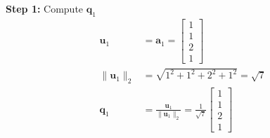 \textbf{Step 1:} Compute $\mathbf{q}_1$
\begin{align*}
    \mathbf{u}_1       & = \mathbf{a}_1 = \begin{bmatrix} 1 \\ 1 \\ 2 \\ 1 \end{bmatrix}                                               \\
    \|\mathbf{u}_1\|_2 & = \sqrt{1^2 + 1^2 + 2^2 + 1^2} = \sqrt{7}                                                                     \\
    \mathbf{q}_1       & = \frac{\mathbf{u}_1}{\|\mathbf{u}_1\|_2} = \frac{1}{\sqrt{7}} \begin{bmatrix} 1 \\ 1 \\ 2 \\ 1 \end{bmatrix}
\end{align*}

